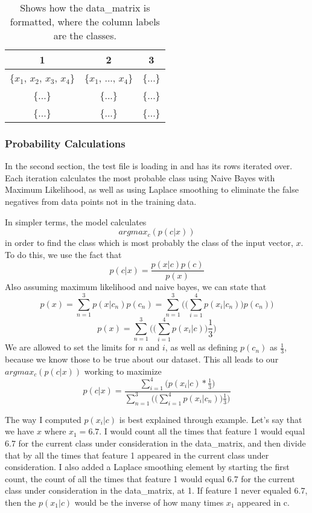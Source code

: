 \documentclass{article}
\begin{document}
\begin{table}[h]
  \centering
  \begin{tabular}{|c|c|c|}
  	\hline
    1 & 2 & 3 \\
    \hline
    \{$x_1$, $x_2$, $x_3$, $x_4$\}& \{$x_1$, ..., $x_4$\} & \{...\} \\
    \{...\} & \{...\} & \{...\} \\
    \{...\} & \{...\} & \{...\} \\
    \hline
  \end{tabular}
  \caption{Shows how the data\_matrix is formatted, where the column labels are the classes.}
\label{tab:formatted-matrix-example}
\end{table}

\subsubsection{Probability Calculations}
In the second section, the test file is loading in and has its rows iterated over. Each iteration calculates the most probable class using Naive Bayes with Maximum Likelihood, as well as using Laplace smoothing to eliminate the false negatives from data points not in the training data. 

In simpler terms, the model calculates
\[ argmax_c(p(c|x))\]
in order to find the class which is most probably the class of the input vector, $x$. To do this, we use the fact that 
\[ p(c|x) = \frac{p(x|c)p(c)}{p(x)}\]
Also assuming maximum likelihood and naive bayes, we can state that
\[ p(x) = \sum\limits_{n=1}^3 p(x|c_n)p(c_n) = \sum\limits_{n=1}^3 \Bigg(\bigg(\sum\limits_{i=1}^4 p(x_i|c_n)\bigg)p(c_n)\Bigg) \]
\[ p(x) = \sum\limits_{n=1}^3 \Bigg( \bigg(\sum\limits_{i=1}^4 p(x_i|c)\bigg)\frac{1}{3}\Bigg) \]
We are allowed to set the limits for $n$ and $i$, as well as defining $p(c_n)$ as $\frac{1}{3}$, because we know those to be true about our dataset. This all leads to our $argmax_c(p(c|x))$ working to maximize
\[ p(c|x) = \frac{\sum\limits_{i=1}^4 \Big(p(x_i|c)*\frac{1}{3}\Big)}{\sum\limits_{n=1}^3 \Bigg(\bigg(\sum\limits_{i=1}^4 p(x_i|c_n)\bigg)\frac{1}{3}\Bigg)}\]

The way I computed $p(x_i|c)$ is best explained through example. Let's say that we have $x$ where $x_1 = 6.7$. I would count all the times that feature 1 would equal 6.7 for the current class under consideration in the data\_matrix, and then divide that by all the times that feature 1 appeared in the current class under consideration. I also added a Laplace smoothing element by starting the first count, the count of all the times that feature 1 would equal 6.7 for the current class under consideration in the data\_matrix, at 1. If feature 1 never equaled 6.7, then the $p(x_1|c)$ would be the inverse of how many times $x_1$ appeared in c.
\end{document}
